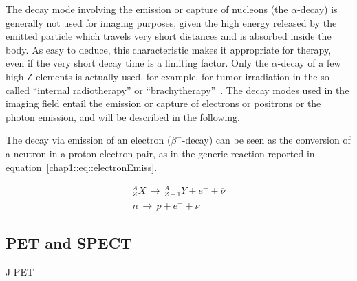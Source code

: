 The decay mode involving the emission or capture of nucleons (the $\alpha$-decay) is generally not used for imaging purposes, given the high energy released by the emitted particle which travels very short distances and is absorbed inside the body. As easy to deduce, this characteristic makes it appropriate for therapy, even if the very short decay time is a limiting factor. Only the $\alpha$-decay of a few high-Z elements is actually used, for example, for tumor irradiation in the so-called \enquote{internal radiotherapy} or \enquote{brachytherapy}~\parencite{Suntharalingam2005, Dahiya2016}. 
The decay modes used in the imaging field entail the emission or capture of electrons or positrons or the photon emission, and will be described in the following. 

The decay via emission of an electron  ($\beta^-$-decay) can be seen as the conversion of a neutron in a proton-electron pair, as in the generic reaction reported in equation~\ref{chap1::eq::electronEmiss}.

\begin{equation}\label{chap1::eq::electronEmiss}
\begin{split}
^{A}_{Z}X \, \rightarrow \, ^{A}_{Z+1}Y + e^{-} + \overline{\nu} \\
n \, \rightarrow \, p + e^{-} + \overline{\nu} 
\end{split}
\end{equation}    


\subsection{PET and SPECT}\label{chap1::subsec::PET-SPECT}

J-PET \parencite{Niedzwiecki2017}


\clearpage
